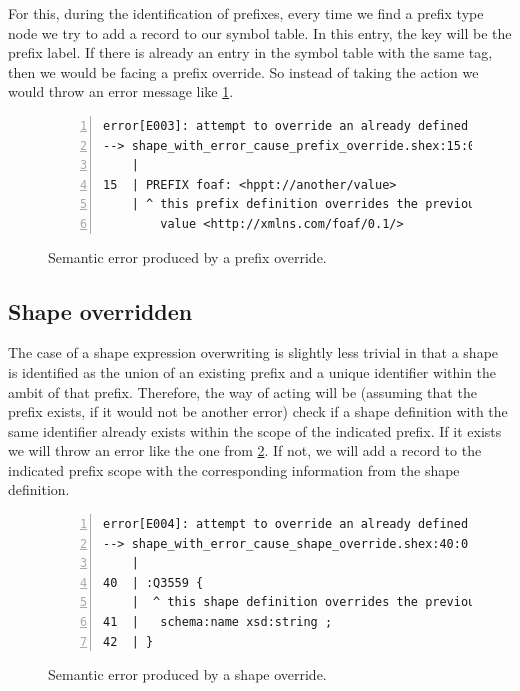 For this, during the identification of prefixes, every time we find a prefix type node we try to add a record
to our symbol table. In this entry, the key will be the prefix label. If there is already an entry in the symbol
table with the same tag, then we would be facing a prefix override. So instead of taking the action we would
throw an error message like \cref{fig:err-override-prefix}.

\begin{figure}
    \begin{lstlisting}[numbers=left,basicstyle=\ttfamily\scriptsize]
error[E003]: attempt to override an already defined prefix
--> shape_with_error_cause_prefix_override.shex:15:0
    |
15  | PREFIX foaf: <hppt://another/value>
    | ^ this prefix definition overrides the previous one (9:0) with
        value <http://xmlns.com/foaf/0.1/>
    \end{lstlisting}
    \caption[Semantic error produced by a prefix override]{Semantic error produced by a prefix override.}
    \label{fig:err-override-prefix}
\end{figure}

\subsection{Shape overridden}
The case of a shape expression overwriting is slightly less trivial in that a shape is identified as the
union of an existing prefix and a unique identifier within the ambit of that prefix. Therefore, the way
of acting will be (assuming that the prefix exists, if it would not be another error) check if a shape
definition with the same identifier already exists within the scope of the indicated prefix. If it exists
we will throw an error like the one from \cref{fig:err-override-shape}. If not, we will add a record to the
indicated prefix scope with the corresponding information from the shape definition.

\begin{figure}
    \begin{lstlisting}[numbers=left,basicstyle=\ttfamily\scriptsize]
error[E004]: attempt to override an already defined shape
--> shape_with_error_cause_shape_override.shex:40:0
    |
40  | :Q3559 {
    |  ^ this shape definition overrides the previous one (17:0)
41  |   schema:name xsd:string ;
42  | }
    \end{lstlisting}
    \caption[Semantic error produced by a shape override]{Semantic error produced by a shape override.}
    \label{fig:err-override-shape}
\end{figure}

